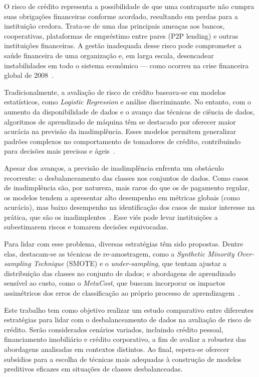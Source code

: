 O risco de crédito representa a possibilidade de que uma contraparte não cumpra suas obrigações financeiras conforme acordado, resultando em perdas para a instituição credora. Trata-se de uma das principais ameaças aos bancos, cooperativas, plataformas de empréstimo entre pares (P2P lending) e outras instituições financeiras. A gestão inadequada desse risco pode comprometer a saúde financeira de uma organização e, em larga escala, desencadear instabilidades em todo o sistema econômico — como ocorreu na crise financeira global de 2008~\cite{Christiano2008}.

Tradicionalmente, a avaliação de risco de crédito baseava-se em modelos estatísticos, como \textit{Logistic Regression} e análise discriminante. No entanto, com o aumento da disponibilidade de dados e o avanço das técnicas de ciência de dados, algoritmos de aprendizado de máquina têm se destacado por oferecer maior acurácia na previsão da inadimplência. Esses modelos permitem generalizar padrões complexos no comportamento de tomadores de crédito, contribuindo para decisões mais precisas e ágeis~\cite{Shi2022}.

Apesar dos avanços, a previsão de inadimplência enfrenta um obstáculo recorrente: o desbalanceamento das classes nos conjuntos de dados. Como casos de inadimplência são, por natureza, mais raros do que os de pagamento regular, os modelos tendem a apresentar alto desempenho em métricas globais (como acurácia), mas baixo desempenho na identificação dos casos de maior interesse na prática, que são os inadimplentes~\cite{Namvar2018}. Esse viés pode levar instituições a subestimarem riscos e tomarem decisões equivocadas.

Para lidar com esse problema, diversas estratégias têm sido propostas. Dentre elas, destacam-se as técnicas de re-amostragem, como a \textit{Synthetic Minority Over-sampling Technique} (SMOTE) e o \textit{under-sampling}, que tentam ajustar a distribuição das classes no conjunto de dados; e abordagens de aprendizado sensível ao custo, como o \textit{MetaCost}, que buscam incorporar os impactos assimétricos dos erros de classificação ao próprio processo de aprendizagem~\cite{FernndezCs2018,Wei2025}.

Este trabalho tem como objetivo realizar um estudo comparativo entre diferentes estratégias para lidar com o desbalanceamento de dados na avaliação de risco de crédito. Serão considerados cenários variados, incluindo crédito pessoal, financiamento imobiliário e crédito corporativo, a fim de avaliar a robustez das abordagens analisadas em contextos distintos. Ao final, espera-se oferecer subsídios para a escolha de técnicas mais adequadas à construção de modelos preditivos eficazes em situações de classes desbalanceadas.

